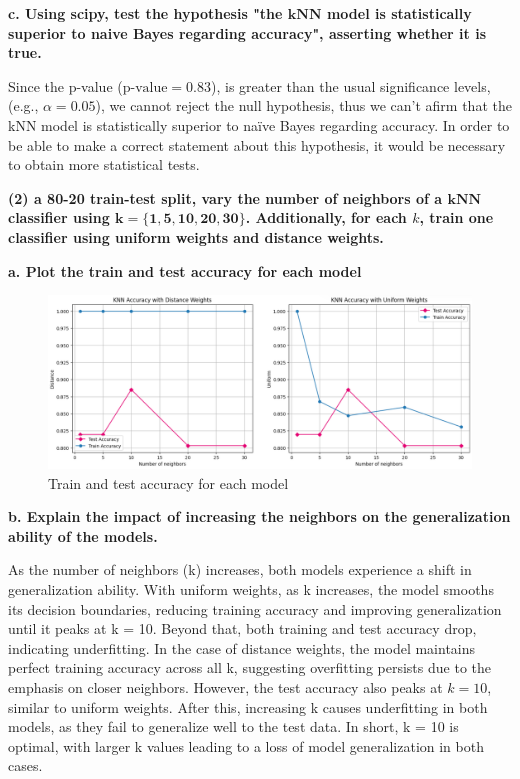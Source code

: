 \documentclass[12pt]{article}
\begin{document}
    \vspace{10pt}
    \textbf{c. Using scipy, test the hypothesis "the $\mathbf{kNN}$ model is statistically superior to naive Bayes regarding accuracy", asserting whether it is true.}

    \vspace{10pt}
    Since the p-value ($\text{p-value} = 0.83$), is greater than the usual significance levels, (e.g., $\alpha = 0.05$), we cannot reject the null hypothesis, thus we can't afirm that the kNN model is statistically superior to naïve Bayes regarding accuracy.
    In order to be able to make a correct statement about this hypothesis, it would be necessary to obtain more statistical tests.

    \vspace{20pt}
    \textbf{(2) a 80-20 train-test split, vary the number of neighbors of a $\mathbf{kNN}$ classifier using $\mathbf{k=\{1, 5, 10, 20, 30\}}$. Additionally, for each $k$, train one classifier using uniform weights and distance weights.}

    \vspace{10pt}
    \textbf{a. Plot the train and test accuracy for each model}

    \vspace{20pt}
    

    \begin{figure}[H]
        \centering
        \includegraphics[width=12cm]{./Part II/2_a.png}
        \caption{Train and test accuracy for each model}
    \end{figure}

    \vspace{20pt}
    \textbf{b. Explain the impact of increasing the neighbors on the generalization ability of the models.}

    \vspace{10pt}
    As the number of neighbors (k) increases, both models experience a shift in generalization ability. With uniform weights, as k increases, the model smooths its decision boundaries, reducing training accuracy and improving generalization until it peaks at k = 10. Beyond that, both training and test accuracy drop, indicating underfitting.
    In the case of distance weights, the model maintains perfect training accuracy across all k, suggesting overfitting persists due to the emphasis on closer neighbors. However, the test accuracy also peaks at $k = 10$, similar to uniform weights. After this, increasing k causes underfitting in both models, as they fail to generalize well to the test data. In short, k = 10 is optimal, with larger k values leading to a loss of model generalization in both cases.
\end{document}
